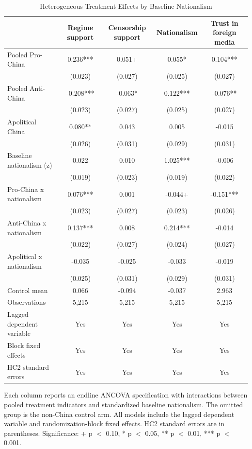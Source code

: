 \begin{table}[H]
\centering
\caption{Heterogeneous Treatment Effects by Baseline Nationalism}
\label{tab:het_nat_t1}
\footnotesize
\begin{threeparttable}
\begin{tabular}{lcccc}
\toprule
 & Regime support & Censorship support & Nationalism & Trust in foreign media \\
\midrule
Pooled Pro-China & 0.236*** & 0.051+ & 0.055* & 0.104*** \\
 & (0.023) & (0.027) & (0.025) & (0.027) \\
\addlinespace
Pooled Anti-China & -0.208*** & -0.063* & 0.122*** & -0.076** \\
 & (0.023) & (0.027) & (0.025) & (0.027) \\
\addlinespace
Apolitical China & 0.080** & 0.043 & 0.005 & -0.015 \\
 & (0.026) & (0.031) & (0.029) & (0.031) \\
\addlinespace
Baseline nationalism (z) & 0.022 & 0.010 & 1.025*** & -0.006 \\
 & (0.019) & (0.023) & (0.019) & (0.022) \\
\addlinespace
Pro-China x nationalism & 0.076*** & 0.001 & -0.044+ & -0.151*** \\
 & (0.023) & (0.027) & (0.023) & (0.026) \\
\addlinespace
Anti-China x nationalism & 0.137*** & 0.008 & 0.214*** & -0.014 \\
 & (0.022) & (0.027) & (0.024) & (0.027) \\
\addlinespace
Apolitical x nationalism & -0.035 & -0.025 & -0.033 & -0.019 \\
 & (0.025) & (0.031) & (0.029) & (0.031) \\
\addlinespace
\midrule
Control mean & 0.066 & -0.094 & -0.037 & 2.963 \\
Observations & 5,215 & 5,215 & 5,215 & 5,215 \\
Lagged dependent variable & Yes & Yes & Yes & Yes \\
Block fixed effects & Yes & Yes & Yes & Yes \\
HC2 standard errors & Yes & Yes & Yes & Yes \\
\bottomrule
\end{tabular}
\begin{tablenotes}[flushleft]
\footnotesize
\item Each column reports an endline ANCOVA specification with interactions between pooled treatment indicators and standardized baseline nationalism. The omitted group is the non-China control arm. All models include the lagged dependent variable and randomization-block fixed effects. HC2 standard errors are in parentheses. Significance: + p $<$ 0.10, * p $<$ 0.05, ** p $<$ 0.01, *** p $<$ 0.001.
\end{tablenotes}
\end{threeparttable}
\end{table}
